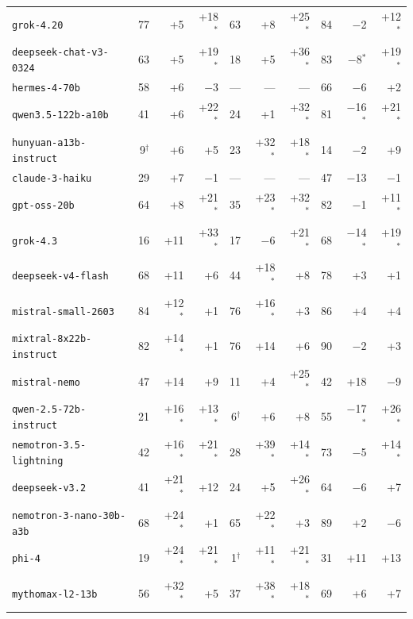 \begin{tabular}{l rrr rrr rrr}
\texttt{grok-4.20} & 77 & +5 & +18$^*$ & 63 & +8 & +25$^*$ & 84 & $-$2 & +12$^*$ \\
\texttt{deepseek-chat-v3-0324} & 63 & +5 & +19$^*$ & 18 & +5 & +36$^*$ & 83 & $-$8$^*$ & +19$^*$ \\
\texttt{hermes-4-70b} & 58 & +6 & $-$3 & --- & --- & --- & 66 & $-$6 & +2 \\
\texttt{qwen3.5-122b-a10b} & 41 & +6 & +22$^*$ & 24 & +1 & +32$^*$ & 81 & $-$16$^*$ & +21$^*$ \\
\texttt{hunyuan-a13b-instruct} & 9$^\dagger$ & +6 & +5 & 23 & +32$^*$ & +18$^*$ & 14 & $-$2 & +9 \\
\texttt{claude-3-haiku} & 29 & +7 & $-$1 & --- & --- & --- & 47 & $-$13 & $-$1 \\
\texttt{gpt-oss-20b} & 64 & +8 & +21$^*$ & 35 & +23$^*$ & +32$^*$ & 82 & $-$1 & +11$^*$ \\
\texttt{grok-4.3} & 16 & +11 & +33$^*$ & 17 & $-$6 & +21$^*$ & 68 & $-$14$^*$ & +19$^*$ \\
\texttt{deepseek-v4-flash} & 68 & +11 & +6 & 44 & +18$^*$ & +8 & 78 & +3 & +1 \\
\texttt{mistral-small-2603} & 84 & +12$^*$ & +1 & 76 & +16$^*$ & +3 & 86 & +4 & +4 \\
\texttt{mixtral-8x22b-instruct} & 82 & +14$^*$ & +1 & 76 & +14 & +6 & 90 & $-$2 & +3 \\
\texttt{mistral-nemo} & 47 & +14 & +9 & 11 & +4 & +25$^*$ & 42 & +18 & $-$9 \\
\texttt{qwen-2.5-72b-instruct} & 21 & +16$^*$ & +13$^*$ & 6$^\dagger$ & +6 & +8 & 55 & $-$17$^*$ & +26$^*$ \\
\texttt{nemotron-3.5-lightning} & 42 & +16$^*$ & +21$^*$ & 28 & +39$^*$ & +14$^*$ & 73 & $-$5 & +14$^*$ \\
\texttt{deepseek-v3.2} & 41 & +21$^*$ & +12 & 24 & +5 & +26$^*$ & 64 & $-$6 & +7 \\
\texttt{nemotron-3-nano-30b-a3b} & 68 & +24$^*$ & +1 & 65 & +22$^*$ & +3 & 89 & +2 & $-$6 \\
\texttt{phi-4} & 19 & +24$^*$ & +21$^*$ & 1$^\dagger$ & +11$^*$ & +21$^*$ & 31 & +11 & +13 \\
\texttt{mythomax-l2-13b} & 56 & +32$^*$ & +5 & 37 & +38$^*$ & +18$^*$ & 69 & +6 & +7 \\
\bottomrule
\end{tabular}
